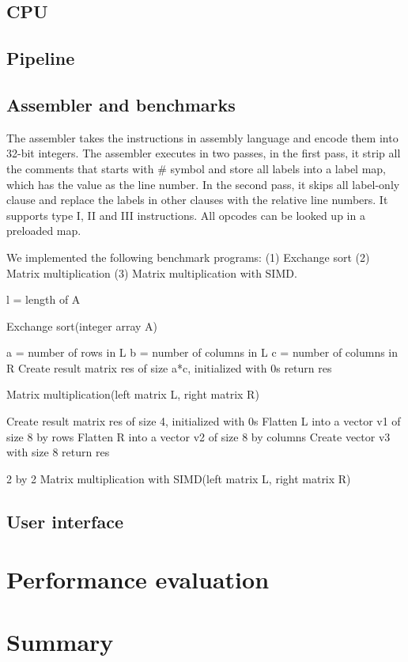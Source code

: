 \documentclass{sig-alternate}
\begin{document}


\subsection{CPU}
\subsection{Pipeline}
\subsection{Assembler and benchmarks}
The assembler takes the instructions in assembly language and encode them into 32-bit integers. The assembler executes in two passes, in the first pass, it strip all the comments that starts with $\#$ symbol and store all labels into a label map, which has the value as the line number. In the second pass, it skips all label-only clause and replace the labels in other clauses with the relative line numbers. It supports type I, II and III instructions. 
All opcodes can be looked up in a preloaded map. 

We implemented the following benchmark programs: (1) Exchange sort (2) Matrix multiplication (3) Matrix multiplication with SIMD.
\begin{algorithm}[]
\SetAlgoLined
 l = length of A\;
 \caption{Exchange sort(integer array A)}
\end{algorithm}

\begin{algorithm}[]
\SetAlgoLined
 a = number of rows in L\;
 b = number of columns in L\;
 c = number of columns in R\;
 Create result matrix res of size a*c, initialized with 0s\;
 return res\;
 \caption{Matrix multiplication(left matrix L, right matrix R)}
\end{algorithm}

\begin{algorithm}[]
\SetAlgoLined
 Create result matrix res of size 4, initialized with 0s\;
 Flatten L into a vector v1 of size 8 by rows\;
 Flatten R into a vector v2 of size 8 by columns\;
Create vector v3 with size 8\;
 return res\;
 \caption{2 by 2 Matrix multiplication with SIMD(left matrix L, right matrix R)}
\end{algorithm}

\subsection{User interface}
\section{Performance evaluation}
\section{Summary}
\end{document}
